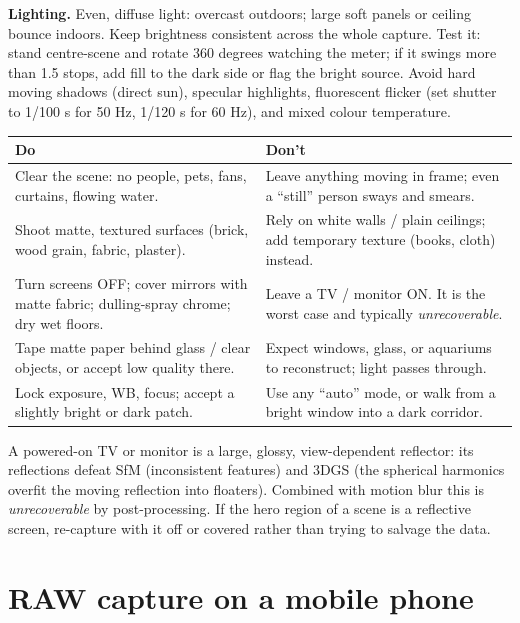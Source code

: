 \documentclass[a4paper,11pt]{article}
\begin{document}
\textbf{Lighting.} Even, diffuse light: overcast outdoors; large soft panels or ceiling bounce
indoors. Keep brightness consistent across the whole capture. Test it: stand centre-scene and rotate
360 degrees watching the meter; if it swings more than 1.5 stops, add fill to the dark side or flag
the bright source. Avoid hard moving shadows (direct sun), specular highlights, fluorescent flicker
(set shutter to 1/100 s for 50 Hz, 1/120 s for 60 Hz), and mixed colour temperature.

\begin{center}
\small
\begin{tabularx}{\linewidth}{X X}
\toprule
\textbf{Do} & \textbf{Don't} \\
\midrule
Clear the scene: no people, pets, fans, curtains, flowing water. & Leave anything moving in frame; even a ``still'' person sways and smears. \\
Shoot matte, textured surfaces (brick, wood grain, fabric, plaster). & Rely on white walls / plain ceilings; add temporary texture (books, cloth) instead. \\
Turn screens OFF; cover mirrors with matte fabric; dulling-spray chrome; dry wet floors. & Leave a TV / monitor ON. It is the worst case and typically \emph{unrecoverable}. \\
Tape matte paper behind glass / clear objects, or accept low quality there. & Expect windows, glass, or aquariums to reconstruct; light passes through. \\
Lock exposure, WB, focus; accept a slightly bright or dark patch. & Use any ``auto'' mode, or walk from a bright window into a dark corridor. \\
\bottomrule
\end{tabularx}
\end{center}

\begin{riskbox}[Reflective / transparent / moving = capture failure]
A powered-on TV or monitor is a large, glossy, view-dependent reflector: its reflections defeat SfM
(inconsistent features) and 3DGS (the spherical harmonics overfit the moving reflection into
floaters). Combined with motion blur this is \emph{unrecoverable} by post-processing. If the hero
region of a scene is a reflective screen, re-capture with it off or covered rather than trying to
salvage the data.
\end{riskbox}

\section{RAW capture on a mobile phone}
\end{document}
